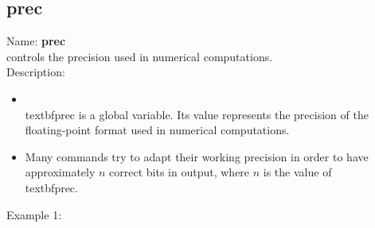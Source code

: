 \subsection{prec}
\label{labprec}
\noindent Name: \textbf{prec}\\
controls the precision used in numerical computations.\\
\noindent Description: \begin{itemize}

\item \\textbf{prec} is a global variable. Its value represents the precision of the \n   floating-point format used in numerical computations.\n
\item Many commands try to adapt their working precision in order to have \n   approximately $n$ correct bits in output, where $n$ is the value of \\textbf{prec}.\n\end{itemize}
\noindent Example 1: 
\begin{center}\begin{minipage}{15cm}\begin{Verbatim}[frame=single]
\end{Verbatim}
\end{minipage}\end{center}
